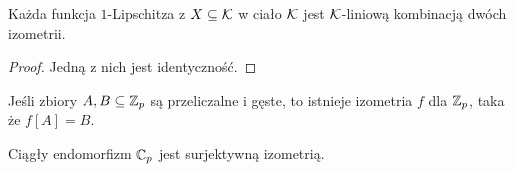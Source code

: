 \begin{fakt}
	Każda funkcja $1$-Lipschitza z $X \subseteq \mathcal K$ w ciało $\mathcal K$ jest $\mathcal K$-liniową kombinacją dwóch izometrii.
\end{fakt}

\begin{proof}
	Jedną z nich jest identyczność.
\end{proof}

\begin{fakt}
	Jeśli zbiory $A, B \subseteq \mathbb Z_p$ są przeliczalne i gęste, to istnieje izometria $f$ dla $\mathbb Z_p$, taka że $f[A] = B$.
\end{fakt}

\begin{fakt}
	Ciągły endomorfizm $\mathbb C_p$ jest surjektywną izometrią.
\end{fakt}